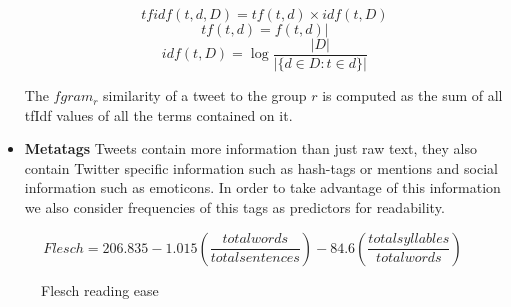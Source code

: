 \documentclass{sig-alternate-05-2015}
\begin{document}
\begin{itemize}
\begin{equation}
 tfidf(t,d,D) = tf(t,d) \times idf(t,D)
\end{equation}
\begin{equation}
 tf(t,d)= f(t,d)|
\end{equation}
\begin{equation}
idf(t,D)= \log \frac{|D|}{|\{d \in D : t \in d\}|}
\end{equation}

The $fgram_r$ similarity of a tweet to the group $r$ is computed as the sum of all tfIdf values of all the terms contained on it. 

\item \textbf{Metatags}
Tweets contain more information than just raw text, they also contain Twitter specific information such as hash-tags or mentions and social information such as emoticons. In order to take advantage of this information we also consider frequencies of this tags as predictors for readability.
\end{itemize}




\begin{figure}[h]
\[ Flesch = 206.835 -1.015 ( \frac{total words}{total sentences}  ) -84.6 ( \frac{total syllables}{total words}) \]
\caption{Flesch reading ease}
\label{fig:flesh}
\end{figure}



\end{document}
